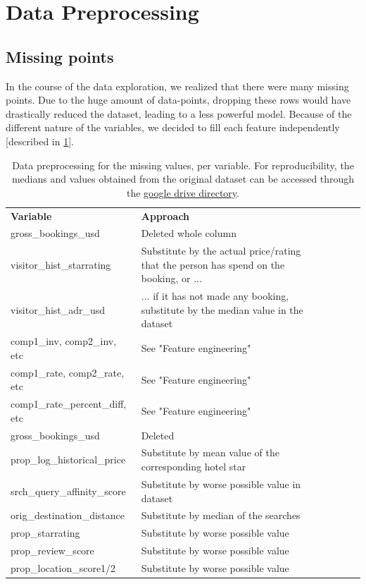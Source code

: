 \documentclass[9pt]{llncs}
\begin{document}
\section{Data Preprocessing}
\subsection{Missing points}
In the course of the data exploration, we realized that there were many missing points. Due to the huge amount of data-points, dropping these rows would have drastically reduced the dataset, leading to a less powerful model. Because of the different nature of the variables, we decided to fill each feature independently [described in \ref{table_fillingmp}]. 


\begin{table}
\tiny
\centering
\caption{Data preprocessing for the missing values, per variable. For reproducibility, the medians and values obtained from the original dataset can be accessed through the \href{https://drive.google.com/drive/folders/0B7x1X9kzuXl6aGZxQTNoaEc3Nnc?usp=sharing}{google drive directory}.}
\begin{tabular}{lllllll}
\hline\noalign{\smallskip}
\textbf{Variable} & \textbf{Approach} \\
\noalign{\smallskip}
\hline
\noalign{\smallskip}
gross\_bookings\_usd & Deleted whole column\\
visitor\_hist\_starrating & Substitute by the actual price/rating that the person has spend on the booking, or ...\\
visitor\_hist\_adr\_usd & ... if it has not made any booking, substitute by the median value in the dataset\\
comp1\_inv, comp2\_inv, etc& See "Feature engineering"\\
comp1\_rate, comp2\_rate, etc & See "Feature engineering"\\
comp1\_rate\_percent\_diff, etc & See "Feature engineering"\\
gross\_bookings\_usd & Deleted \\ 
prop\_log\_historical\_price & Substitute by mean value of the corresponding hotel star \\ 
srch\_query\_affinity\_score & Substitute by worse possible value in dataset \\ 
orig\_destination\_distance & Substitute by median of the searches \\ 
prop\_starrating & Substitute by worse possible value \\ 
prop\_review\_score & Substitute by worse possible value \\ 
prop\_location\_score1/2 & Substitute by worse possible value \\ 
\hline
\end{tabular}
\label{table_fillingmp}
\end{table}
\end{document}
